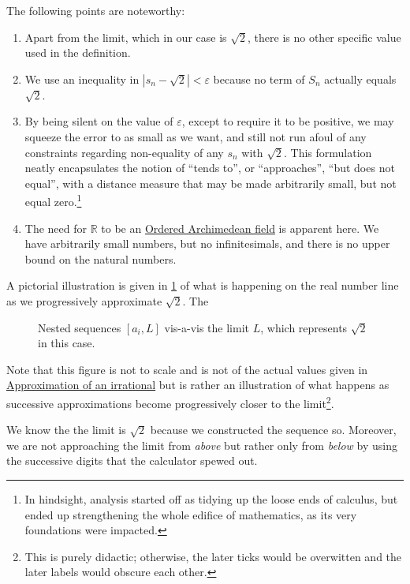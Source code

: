 \documentclass[
  a4paper,
]{article}
\begin{document}
The following points are noteworthy:

\begin{enumerate}
\item
  Apart from the limit, which in our case is \(\sqrt{2}\), there is no
  other specific value used in the definition.
\item
  We use an inequality in \(|s_{n} - \sqrt{2}| < \varepsilon\) because
  no term of \(S_{n}\) actually equals \(\sqrt{2}\).
\item
  By being silent on the value of \(\varepsilon\), except to require it
  to be positive, we may squeeze the error to as small as we want, and
  still not run afoul of any constraints regarding non-equality of any
  \(s_{n}\) with \(\sqrt{2}\). This formulation neatly encapsulates the
  notion of ``tends to'', or ``approaches'', ``but does not equal'',
  with a distance measure that may be made arbitrarily small, but not
  equal zero.\footnote{In hindsight, analysis started off as tidying up
    the loose ends of calculus, but ended up strengthening the whole
    edifice of mathematics, as its very foundations were impacted.}
\item
  The need for \(\mathbb{R}\) to be an
  \hyperref[ordered-archimedean-field]{Ordered Archimedean field} is
  apparent here. We have arbitrarily small numbers, but no
  infinitesimals, and there is no upper bound on the natural numbers.
\end{enumerate}

A pictorial illustration is given in \cref{fig:nested} of what is
happening on the real number line as we progressively approximate
\(\sqrt{2}\). The

\begin{figure}
\centering

\caption{Nested sequences \([a_i, L]\) vis-a-vis the limit \(L\), which
represents \(\sqrt{2}\) in this case.}\label{fig:nested}
\end{figure}

Note that this figure is not to scale and is not of the actual values
given in \hyperref[approximation-of-an-irrational]{Approximation of an
irrational} but is rather an illustration of what happens as successive
approximations become progressively closer to the limit\footnote{This is
  purely didactic; otherwise, the later ticks would be overwitten and
  the later labels would obscure each other.}.

We know the the limit is \(\sqrt{2}\) because we constructed the
sequence so. Moreover, we are not approaching the limit from
\emph{above} but rather only from \emph{below} by using the successive
digits that the calculator spewed out.
\end{document}
